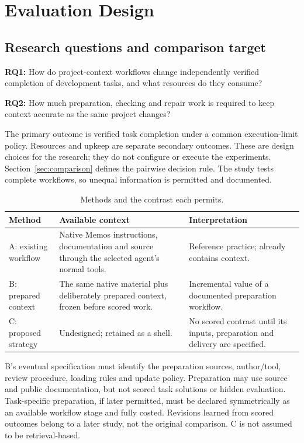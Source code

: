 \section{Evaluation Design}
\label{sec:methodology}

\subsection{Research questions and comparison target}
\textbf{RQ1:} How do project-context workflows change independently verified
completion of development tasks, and what resources do they consume?

\textbf{RQ2:} How much preparation, checking and repair work is required to keep
context accurate as the same project changes?

The primary outcome is verified task completion under a common execution-limit
policy. Resources and upkeep are separate secondary outcomes. These are design
choices for the research; they do not configure or execute the experiments.
Section~\ref{sec:comparison} defines the pairwise decision rule. The study tests
complete workflows, so unequal information is permitted and documented.

\begin{table}[htbp]
\centering\small
\caption{Methods and the contrast each permits.}
\label{tab:methods}
\begin{tabularx}{\textwidth}{@{}>{\raggedright\arraybackslash}p{}Y Y@{}}
\toprule
Method & Available context & Interpretation \\
\midrule
A: existing workflow & Native Memos instructions, documentation and source through the selected agent's normal tools. & Reference practice; already contains context. \\
\addlinespace
B: prepared context & The same native material plus deliberately prepared context, frozen before scored work. & Incremental value of a documented preparation workflow. \\
\addlinespace
C: proposed strategy & Undesigned; retained as a shell. & No scored contrast until its inputs, preparation and delivery are specified. \\
\bottomrule
\end{tabularx}
\end{table}

B's eventual specification must identify the preparation sources, author/tool,
review procedure, loading rules and update policy. Preparation may use source
and public documentation, but not scored task solutions or hidden evaluation.
Task-specific preparation, if later permitted, must be declared symmetrically
as an available workflow stage and fully costed. Revisions learned from scored
outcomes belong to a later study, not the original comparison. C is not assumed
to be retrieval-based.

